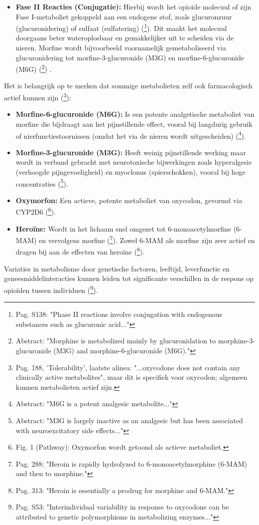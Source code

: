 \documentclass[11pt, a4paper]{report} %
\begin{document}
\begin{itemize}
\begin{itemize}
        \end{itemize}
    \item \textbf{Fase II Reacties (Conjugatie):} Hierbij wordt het opioïde molecuul of zijn Fase I-metaboliet gekoppeld aan een endogene stof, zoals glucuronzuur (glucuronidering) of sulfaat (sulfatering) (\cite{Trescot2008OpioidPharm}\footnote{Pag. S138: "Phase II reactions involve conjugation with endogenous substances such as glucuronic acid..."}). Dit maakt het molecuul doorgaans beter wateroplosbaar en gemakkelijker uit te scheiden via de nieren. Morfine wordt bijvoorbeeld voornamelijk gemetaboliseerd via glucuronidering tot morfine-3-glucuronide (M3G) en morfine-6-glucuronide (M6G) (\cite{GarciaPerez2022M3G}\footnote{Abstract: "Morphine is metabolized mainly by glucuronidation to morphine-3-glucuronide (M3G) and morphine-6-glucuronide (M6G)."}) .
\end{itemize}
Het is belangrijk op te merken dat sommige metabolieten zelf ook farmacologisch actief kunnen zijn (\cite{Riley2008OxycodoneReview}\footnote{Pag. 188, 'Tolerability', laatste alinea: "...oxycodone does not contain any clinically active metabolites", maar dit is specifiek voor oxycodon; algemeen kunnen metabolieten actief zijn.}):
\begin{itemize}
    \item \textbf{Morfine-6-glucuronide (M6G):} Is een potente analgetische metaboliet van morfine die bijdraagt aan het pijnstillende effect, vooral bij langdurig gebruik of nierfunctiestoornissen (omdat het via de nieren wordt uitgescheiden) (\cite{GarciaPerez2022M3G}\footnote{Abstract: "M6G is a potent analgesic metabolite..."}).
    \item \textbf{Morfine-3-glucuronide (M3G):} Heeft weinig pijnstillende werking maar wordt in verband gebracht met neurotoxische bijwerkingen zoals hyperalgesie (verhoogde pijngevoeligheid) en myoclonus (spierschokken), vooral bij hoge concentraties (\cite{GarciaPerez2022M3G}\footnote{Abstract: "M3G is largely inactive as an analgesic but has been associated with neuroexcitatory side effects..."}).
    \item \textbf{Oxymorfon:} Een actieve, potente metaboliet van oxycodon, gevormd via CYP2D6 (\cite{PMC2019OxycodonePathway}\footnote{Fig. 1 (Pathway): Oxymorfon wordt getoond als actieve metaboliet.}).
    \item \textbf{Heroïne:} Wordt in het lichaam snel omgezet tot 6-monoacetylmorfine (6-MAM) en vervolgens morfine (\cite{Gupta2010ChemistryOpioids}\footnote{Pag. 288: "Heroin is rapidly hydrolyzed to 6-monoacetylmorphine (6-MAM) and then to morphine."}). Zowel 6-MAM als morfine zijn zeer actief en dragen bij aan de effecten van heroïne (\cite{WhiteComiskey2007HeroinEpidemics}\footnote{Pag. 313: "Heroin is essentially a prodrug for morphine and 6-MAM."}).
\end{itemize}
Variaties in metabolisme door genetische factoren, leeftijd, leverfunctie en geneesmiddelinteracties kunnen leiden tot significante verschillen in de respons op opioïden tussen individuen (\cite{Kalso2005OxycodoneReview}\footnote{Pag. S53: "Interindividual variability in response to oxycodone can be attributed to genetic polymorphisms in metabolizing enzymes..."}).
\end{document}
